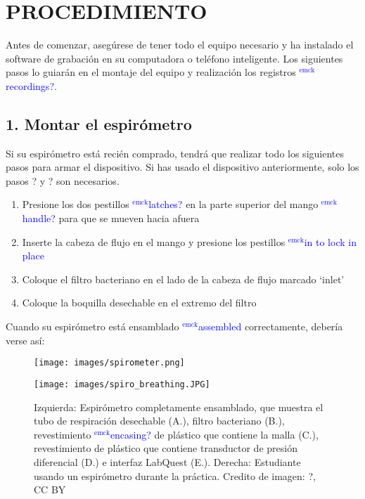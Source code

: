 \documentclass[12pt]{article}
\newcommand{\emck}[1]{\textcolor{blue}{$^{\textrm{emck}}${#1}}}
\begin{document}
\section*{PROCEDIMIENTO}

Antes de comenzar, asegúrese de tener todo el equipo necesario y
ha instalado el software de grabación en su computadora o
teléfono inteligente. Los siguientes pasos lo guiarán en el montaje del
equipo y realización los registros \emck{recordings?}.

\subsection*{1. Montar el espirómetro}

Si su espirómetro está recién comprado, tendrá que realizar todo los
siguientes pasos para armar el dispositivo. Si has usado el
dispositivo anteriormente, solo los pasos ? y ? son necesarios.

\vspace{0.2cm}

\begin{enumerate}
\item Presione los dos pestillos \emck{latches?} en la parte superior
  del mango \emck{handle?} para que se mueven hacia afuera
\item Inserte la cabeza de flujo en el mango y presione los pestillos
  \emck{in to lock in place}
\item Coloque el filtro bacteriano en el lado de la cabeza de flujo
  marcado `inlet'
\item Coloque la boquilla desechable en el extremo del filtro
\end{enumerate}

\vspace{0.2cm}

Cuando su espirómetro está ensamblado \emck {assembled} correctamente,
debería verse así:

\vspace{0.2cm}

\begin{figure}[h!]
\begin{center}
\begin{minipage}{.5\textwidth}
\centering
\texttt{[image: images/spirometer.png]}
\end{minipage}%
\begin{minipage}{.43\textwidth}
\centering
\texttt{[image: images/spiro\_breathing.JPG]}
\end{minipage}
\end{center}
\caption{Izquierda: Espirómetro completamente ensamblado, que muestra
  el tubo de respiración desechable (A.), filtro bacteriano (B.),
  revestimiento \emck{encasing?} de plástico que contiene la malla (C.),
  revestimiento de plástico que contiene transductor de
  presión diferencial (D.) e interfaz LabQuest (E.). Derecha: Estudiante 
  usando un espirómetro durante la práctica. Credito de imagen: ?, CC BY}
\label{fig:spirAssembly}
\end{figure}
\end{document}
